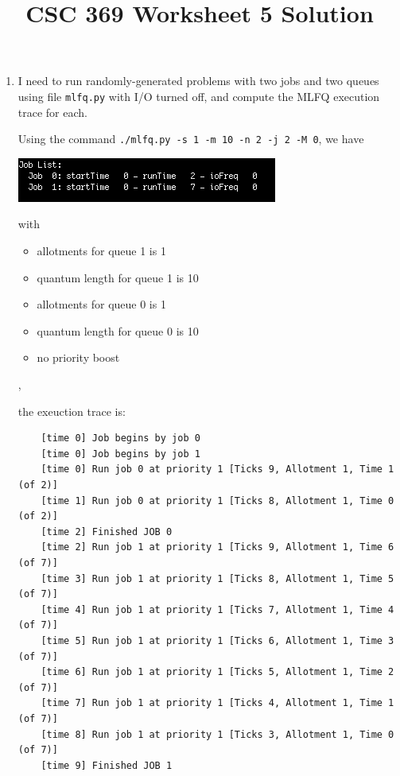 \documentclass[12pt]{article}
\begin{document}
\title{CSC 369 Worksheet 5 Solution}
\maketitle

\bigskip

\begin{enumerate}[1.]
    \item

    \bigskip

    I need to run randomly-generated problems with two jobs and two queues using
    file \texttt{mlfq.py} with I/O turned off, and compute the MLFQ execution trace for each.

    \bigskip

    Using the command \texttt{./mlfq.py -s 1 -m 10 -n 2 -j 2 -M 0}, we have

    \bigskip

    \begin{center}
    \includegraphics[width=0.6\linewidth]{images/worksheet_5_solution_3.png}
    \end{center}

    with

    \begin{itemize}
        \item allotments for queue 1 is 1
        \item quantum length for queue 1 is 10
        \item allotments for queue 0 is 1
        \item quantum length for queue 0 is 10
        \item no priority boost
    \end{itemize},

    the exeuction trace is:

    \bigskip

\begin{lstlisting}
    [time 0] Job begins by job 0
    [time 0] Job begins by job 1
    [time 0] Run job 0 at priority 1 [Ticks 9, Allotment 1, Time 1 (of 2)]
    [time 1] Run job 0 at priority 1 [Ticks 8, Allotment 1, Time 0 (of 2)]
    [time 2] Finished JOB 0
    [time 2] Run job 1 at priority 1 [Ticks 9, Allotment 1, Time 6 (of 7)]
    [time 3] Run job 1 at priority 1 [Ticks 8, Allotment 1, Time 5 (of 7)]
    [time 4] Run job 1 at priority 1 [Ticks 7, Allotment 1, Time 4 (of 7)]
    [time 5] Run job 1 at priority 1 [Ticks 6, Allotment 1, Time 3 (of 7)]
    [time 6] Run job 1 at priority 1 [Ticks 5, Allotment 1, Time 2 (of 7)]
    [time 7] Run job 1 at priority 1 [Ticks 4, Allotment 1, Time 1 (of 7)]
    [time 8] Run job 1 at priority 1 [Ticks 3, Allotment 1, Time 0 (of 7)]
    [time 9] Finished JOB 1
\end{lstlisting}


\end{enumerate}
\end{document}
